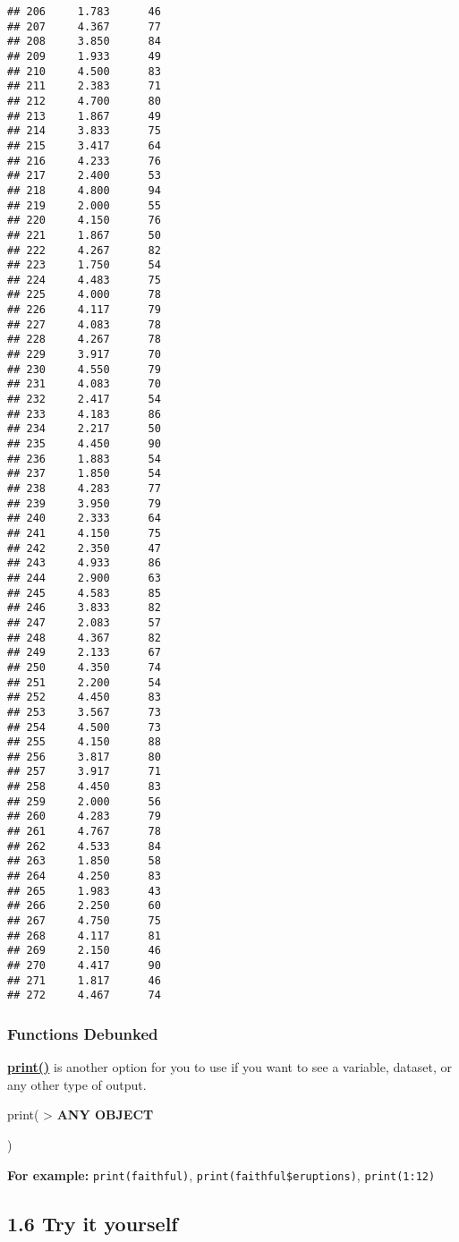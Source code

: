 \documentclass[
]{book}
\begin{document}
\begin{verbatim}
## 206     1.783      46
## 207     4.367      77
## 208     3.850      84
## 209     1.933      49
## 210     4.500      83
## 211     2.383      71
## 212     4.700      80
## 213     1.867      49
## 214     3.833      75
## 215     3.417      64
## 216     4.233      76
## 217     2.400      53
## 218     4.800      94
## 219     2.000      55
## 220     4.150      76
## 221     1.867      50
## 222     4.267      82
## 223     1.750      54
## 224     4.483      75
## 225     4.000      78
## 226     4.117      79
## 227     4.083      78
## 228     4.267      78
## 229     3.917      70
## 230     4.550      79
## 231     4.083      70
## 232     2.417      54
## 233     4.183      86
## 234     2.217      50
## 235     4.450      90
## 236     1.883      54
## 237     1.850      54
## 238     4.283      77
## 239     3.950      79
## 240     2.333      64
## 241     4.150      75
## 242     2.350      47
## 243     4.933      86
## 244     2.900      63
## 245     4.583      85
## 246     3.833      82
## 247     2.083      57
## 248     4.367      82
## 249     2.133      67
## 250     4.350      74
## 251     2.200      54
## 252     4.450      83
## 253     3.567      73
## 254     4.500      73
## 255     4.150      88
## 256     3.817      80
## 257     3.917      71
## 258     4.450      83
## 259     2.000      56
## 260     4.283      79
## 261     4.767      78
## 262     4.533      84
## 263     1.850      58
## 264     4.250      83
## 265     1.983      43
## 266     2.250      60
## 267     4.750      75
## 268     4.117      81
## 269     2.150      46
## 270     4.417      90
## 271     1.817      46
## 272     4.467      74
\end{verbatim}

\hypertarget{functions-debunked-5}{%
\subsubsection{Functions Debunked}\label{functions-debunked-5}}

\textbf{\href{https://www.rdocumentation.org/packages/base/versions/3.6.2/topics/print}{print()}} is another option for you to use if you want to see a variable, dataset, or any other type of output.

print(
\textgreater{} \textbf{ANY OBJECT}

)

\textbf{For example:} \texttt{print(faithful)}, \texttt{print(faithful\$eruptions)}, \texttt{print(1:12)}

\hypertarget{try-it-yourself-5}{%
\subsection{1.6 Try it yourself}\label{try-it-yourself-5}}
\end{document}

